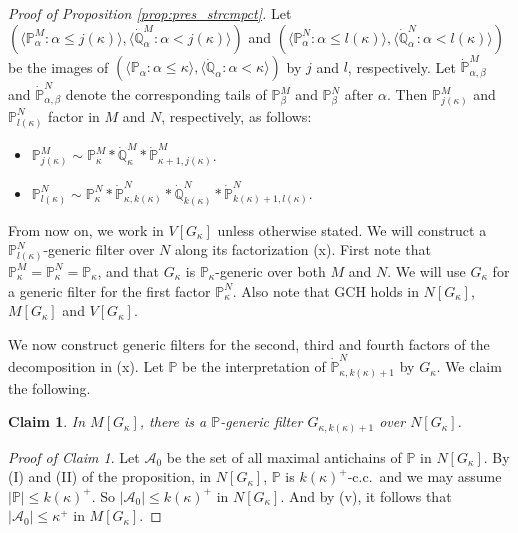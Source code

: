 \documentclass[a4paper,12pt,reqno,oneside]{amsart}
\theoremstyle{plain}
\newtheorem{claim}{Claim}
\newcommand{\mbb}{\mathbb}
\newcommand{\mcal}{\mathcal}
\begin{document}
\begin{proof}[Proof of Proposition \ref{prop:pres_strcmpct}]
Let $( \langle \mbb{P}_\alpha^M : \alpha \leq j( \kappa ) \rangle , \langle \dot{\mbb{Q}}_\alpha^M : \alpha < j( \kappa ) \rangle )$ and $( \langle \mbb{P}_\alpha^N : \alpha \leq l( \kappa ) \rangle , \langle \dot{\mbb{Q}}_\alpha^N : \alpha < l( \kappa ) \rangle )$ be the images of $( \langle \mbb{P}_\alpha : \alpha \leq \kappa \rangle , \langle \dot{\mbb{Q}}_\alpha : \alpha < \kappa \rangle )$ by $j$ and $l$, respectively. Let $\dot{\mbb{P}}_{\alpha , \beta}^M$ and $\dot{\mbb{P}}_{\alpha , \beta}^N$ denote the corresponding tails of $\mbb{P}_\beta^M$ and $\mbb{P}_\beta^N$ after $\alpha$. Then $\mbb{P}_{j( \kappa )}^M$ and $\mbb{P}_{l( \kappa )}^N$ factor in $M$ and $N$, respectively, as follows:
\begin{itemize}
\item[(ix)] $\mbb{P}_{j( \kappa )}^M \sim \mbb{P}_\kappa^M * \dot{\mbb{Q}}_\kappa^M * \dot{\mbb{P}}_{\kappa + 1 , j( \kappa )}^M$.
\item[(x)] $\mbb{P}_{l( \kappa )}^N \sim \mbb{P}_\kappa^N * \dot{\mbb{P}}_{\kappa , k( \kappa )}^N * \dot{\mbb{Q}}_{k( \kappa )}^N * \dot{\mbb{P}}_{k( \kappa ) + 1 , l( \kappa )}^N$.
\end{itemize}


From now on, we work in $V[ G_\kappa ]$ unless otherwise stated. We will construct a $\mbb{P}_{l( \kappa )}^N$-generic filter over $N$ along its factorization (x). First note that $\mbb{P}_\kappa^M = \mbb{P}_\kappa^N = \mbb{P}_\kappa$, and that $G_\kappa$ is $\mbb{P}_\kappa$-generic over both $M$ and $N$. We will use $G_\kappa$ for a generic filter for the first factor $\mbb{P}_\kappa^N$. Also note that GCH holds in $N[ G_\kappa ]$, $M[ G_\kappa ]$ and $V[ G_\kappa ]$.

We now construct generic filters for the second, third and fourth factors of the decomposition in (x). Let $\mbb{P}$ be the interpretation of $\dot{\mbb{P}}_{\kappa , k( \kappa ) +1}^N$ by $G_\kappa$. We claim the following.


\begin{claim}
In $M[ G_\kappa ]$, there is a $\mbb{P}$-generic filter $G_{\kappa , k( \kappa ) + 1}$ over $N[ G_\kappa ]$.
\end{claim}


\noindent
\emph{Proof of Claim 1}.
Let $\mcal{A}_0$ be the set of all maximal antichains of $\mbb{P}$ in $N[ G_\kappa ]$. By (I) and (II) of the proposition, in $N[ G_\kappa ]$, $\mbb{P}$ is $k( \kappa )^+$-c.c.~and we may assume $| \mbb{P} | \leq k( \kappa )^+$. So $| \mcal{A}_0 | \leq k( \kappa )^+$ in $N[ G_\kappa ]$. And by (v), it follows that  $| \mcal{A}_0 | \leq \kappa^+$ in $M[ G_\kappa ]$.


\end{proof}
\end{document}
